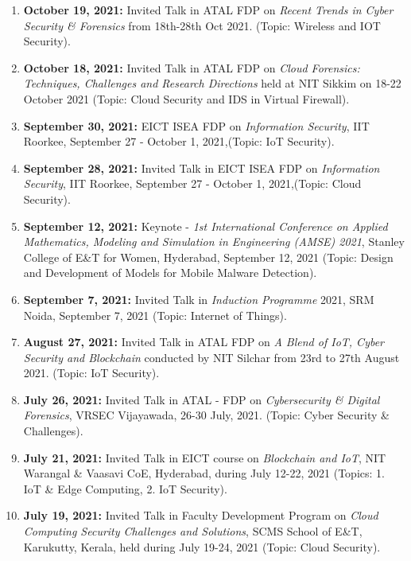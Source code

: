 \begin{enumerate}
\item
\textbf{October 19, 2021:} Invited Talk in ATAL FDP on \textit{Recent Trends in Cyber Security \& Forensics} from 18th-28th Oct 2021. (Topic: Wireless and IOT Security).

\item
\textbf{October 18, 2021:} Invited Talk in ATAL FDP on \textit{Cloud Forensics: Techniques, Challenges and Research Directions} held at NIT Sikkim on 18-22 October 2021 (Topic: Cloud Security and IDS in Virtual Firewall).

\item
\textbf{September 30, 2021:} EICT ISEA FDP on \textit{Information Security}, IIT Roorkee, September 27 - October 1, 2021,(Topic: IoT Security).

\item
\textbf{September 28, 2021:} Invited Talk in EICT ISEA FDP on \textit{Information Security}, IIT Roorkee, September 27 - October 1, 2021,(Topic: Cloud Security).

\item
\textbf{September 12, 2021:} Keynote - \textit{1st International Conference on Applied Mathematics, Modeling and Simulation in Engineering (AMSE) 2021}, Stanley College of E\&T for Women, Hyderabad, September 12, 2021 (Topic: Design and Development of Models for Mobile Malware Detection).

\item
\textbf{September 7, 2021:} Invited Talk in \textit{Induction Programme} 2021, SRM Noida, September 7, 2021 (Topic: Internet of Things).

\item
\textbf{August 27, 2021:} Invited Talk in ATAL FDP on \textit{A Blend of IoT, Cyber Security and Blockchain} conducted by NIT Silchar from 23rd to 27th August 2021. (Topic: IoT Security).

\item
\textbf{July 26, 2021:} Invited Talk in ATAL - FDP on \textit{Cybersecurity \& Digital Forensics}, VRSEC Vijayawada, 26-30 July, 2021. (Topic: Cyber Security & Challenges).

\item
\textbf{July 21, 2021:} Invited Talk in EICT course on \textit{Blockchain and IoT}, NIT Warangal \& Vaasavi CoE, Hyderabad, during July 12-22, 2021 (Topics: 1. IoT \& Edge Computing, 2. IoT Security).

\item
\textbf{July 19, 2021:} Invited Talk in Faculty Development Program on \textit{Cloud Computing Security Challenges and Solutions}, SCMS School of E\&T,  Karukutty, Kerala, held during July 19-24, 2021 (Topic: Cloud Security).


\end{enumerate}
